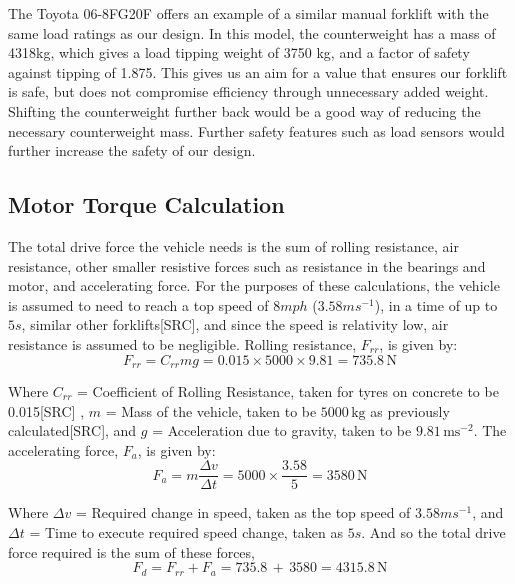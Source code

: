 \documentclass[12pt]{article}
\begin{document}
The Toyota 06-8FG20F \cite{Toyota} offers an example of a similar manual forklift with the same load ratings as our design. In this model, the counterweight has a mass of 4318kg, which gives a load tipping weight of 3750 kg, and a factor of safety against tipping of 1.875. This gives us an aim for a value that ensures our forklift is safe, but does not compromise efficiency through unnecessary added weight. Shifting the  counterweight further back would be a good way of reducing the necessary counterweight mass. Further safety features such as load sensors would further increase the safety of our design.

\subsection{Motor Torque Calculation}

The total drive force the vehicle needs is the sum of rolling resistance, air resistance, other smaller resistive forces such as resistance in the bearings and motor, and accelerating force. For the purposes of these calculations, the vehicle is assumed to need to reach a top speed of $8mph$ ($3.58ms^{-1}$), in a time of up to $5s$, similar other forklifts[SRC], and since the speed is relativity low, air resistance is assumed to be negligible. Rolling resistance, $F_{rr}$, is given by:
\vspace{-20pt}
\begin{equation}
    F_{rr} = C_{rr} m g = 0.015 \times 5000 \times 9.81 =  735.8 \, \text{N}
\end{equation}
\vspace{-40pt}

Where \( C_{rr} \) = Coefficient of Rolling Resistance, taken for tyres on concrete to be 0.015[SRC] \cite{RollingResistance}, \( m \) = Mass of the vehicle, taken to be \( 5000 \, \text{kg} \) as previously calculated[SRC], and \( g \) = Acceleration due to gravity, taken to be \( 9.81 \, \text{ms}^{-2} \). The accelerating force, \( F_a \), is given by:
\vspace{-20pt}
\begin{equation}
    F_a = m\frac{\Delta v}{\Delta t} = 5000\times \frac{3.58}{5} = 3580 \, \text{N}
\end{equation}


Where $\Delta v$ = Required change in speed, taken as the top speed of $3.58ms^{-1}$, and $\Delta t$ = Time to execute required speed change, taken as $5s$. And so the total drive force required is the sum of these forces,
\vspace{-5pt}
\begin{equation}
    F_d = F_{rr} + F_a = 735.8 \, + \, 3580 = 4315.8 \, \text{N}
\end{equation}
\vspace{-40pt}
\end{document}
